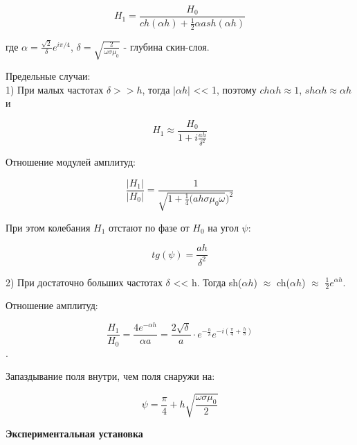\documentclass[a4paper,12pt]{article}
\begin{document}
$$H_1 = \frac{H_0}{ch(\alpha h) + \frac{1}{2}\alpha a sh(\alpha h)}$$

где $\alpha = \frac{\sqrt{2}}{\delta}e^{i\pi/4}$, $\delta = \sqrt{\frac{2}{\omega \sigma {\mu}_0}}$ - глубина скин-слоя. 

Предельные случаи: \\ 

1) При малых частотах $\delta >> h$, тогда $|\alpha h|$ << 1, поэтому $ch\alpha h \approx 1$, $sh \alpha h \approx \alpha h$ и 

$$H_1 \approx \frac{H_0}{1+i\frac{ah}{{\delta}^2}}$$

Отношение модулей амплитуд: 

$$\frac{|H_1|}{|H_0|} = \frac{1}{\sqrt{1 + \frac{1}{4}(ah\sigma{\mu}_0\omega})^2}$$

При этом колебания $H_1$ отстают по фазе от $H_0$ на угол $\psi$:

$$tg(\psi) = \frac{ah}{{\delta}^2}$$

2) При достаточно больших частотах $\delta$ << h. Тогда sh($\alpha h$) $\approx$ ch($\alpha h$) $\approx$ $\frac{1}{2}e^{\alpha h}$.

Отношение амплитуд: 

$$\frac{H_1}{H_0} = \frac{4e^{-\alpha h}}{\alpha a} = \frac{2\sqrt \delta}{a} \cdot e^{-\frac{h}{\delta}}e^{-i(\frac{\pi}{4} + \frac{h}{\delta})}$$. 

Запаздывание поля внутри, чем поля снаружи на: 

$$\psi = \frac{\pi}{4} + h\sqrt{\frac{\omega \sigma {\mu}_0}{2}}$$

\par\textbf{Экспериментальная установка}
\end{document}
